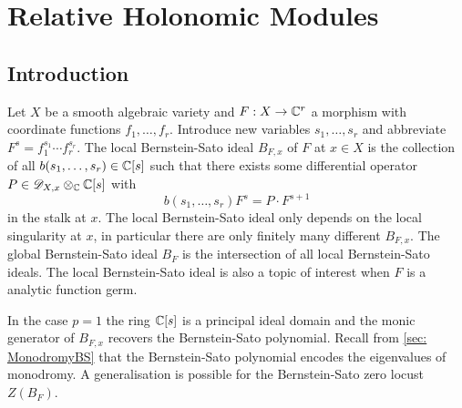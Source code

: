 \chapter{Relative Holonomic Modules}\label{ch: ChapterRelHol}
\section{Introduction}\label{sec: IntoductionChapterRelative}
Let $X$ be a smooth algebraic variety and $F:X\to \mathbb{C}^r$ a morphism with coordinate functions $f_1,\ldots, f_r$.
Introduce new variables $s_1,\ldots, s_r$ and abbreviate $F^s = f_1^{s_1}\cdots f_r^{s_r}$.
The local Bernstein-Sato ideal $B_{F,x}$ of $F$ at $x\in X$ is the collection of all $b(s_1,\ldots,s_r)\in \mathbb{C}[s]$ such that there exists some differential operator $P\in \mathscr{D}_{X,x}\otimes_{\mathbb{C}}\mathbb{C}[s]$ with
$$b(s_1,\ldots,s_r) F^s =  P\cdot F^{s + 1}$$
in the stalk at $x$.
The local Bernstein-Sato ideal only depends on the local singularity at $x$, in particular there are only finitely many different $B_{F,x}$.
The global Bernstein-Sato ideal $B_F$ is the intersection of all local Bernstein-Sato ideals.
The local Bernstein-Sato ideal is also a topic of interest when $F$ is a analytic function germ.

In the case $p=1$ the ring $\mathbb{C}[s]$ is a principal ideal domain and the monic generator of $B_{F,x}$ recovers the Bernstein-Sato polynomial.
Recall from \cref{sec: MonodromyBS} that the Bernstein-Sato polynomial encodes the eigenvalues of monodromy.
A generalisation is possible for the Bernstein-Sato zero locust $Z(B_F)$.

